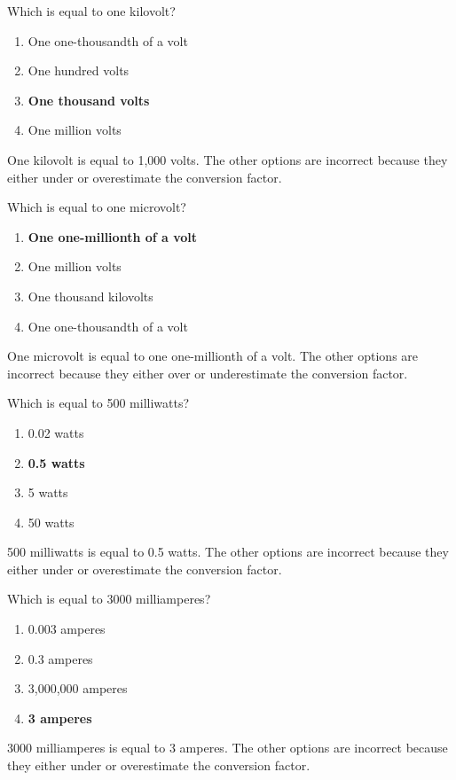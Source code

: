 \begin{tcolorbox}[colback=gray!10!white,colframe=black!75!black,title={T5B03}]
    Which is equal to one kilovolt?
    \begin{enumerate}[label=\Alph*),noitemsep]
        \item One one-thousandth of a volt
        \item One hundred volts
        \item \textbf{One thousand volts}
        \item One million volts
    \end{enumerate}
\end{tcolorbox}
One kilovolt is equal to 1,000 volts. The other options are incorrect because they either under or overestimate the conversion factor.

\begin{tcolorbox}[colback=gray!10!white,colframe=black!75!black,title={T5B04}]
    Which is equal to one microvolt?
    \begin{enumerate}[label=\Alph*),noitemsep]
        \item \textbf{One one-millionth of a volt}
        \item One million volts
        \item One thousand kilovolts
        \item One one-thousandth of a volt
    \end{enumerate}
\end{tcolorbox}
One microvolt is equal to one one-millionth of a volt. The other options are incorrect because they either over or underestimate the conversion factor.

\begin{tcolorbox}[colback=gray!10!white,colframe=black!75!black,title={T5B05}]
    Which is equal to 500 milliwatts?
    \begin{enumerate}[label=\Alph*),noitemsep]
        \item 0.02 watts
        \item \textbf{0.5 watts}
        \item 5 watts
        \item 50 watts
    \end{enumerate}
\end{tcolorbox}
500 milliwatts is equal to 0.5 watts. The other options are incorrect because they either under or overestimate the conversion factor.

\begin{tcolorbox}[colback=gray!10!white,colframe=black!75!black,title={T5B06}]
    Which is equal to 3000 milliamperes?
    \begin{enumerate}[label=\Alph*),noitemsep]
        \item 0.003 amperes
        \item 0.3 amperes
        \item 3,000,000 amperes
        \item \textbf{3 amperes}
    \end{enumerate}
\end{tcolorbox}
3000 milliamperes is equal to 3 amperes. The other options are incorrect because they either under or overestimate the conversion factor.

